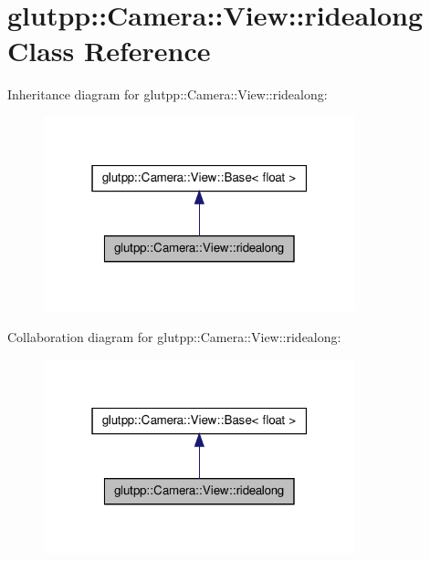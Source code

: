 \hypertarget{classglutpp_1_1Camera_1_1View_1_1ridealong}{\section{glutpp\-:\-:\-Camera\-:\-:\-View\-:\-:ridealong \-Class \-Reference}
\label{classglutpp_1_1Camera_1_1View_1_1ridealong}
}


\-Inheritance diagram for glutpp\-:\-:\-Camera\-:\-:\-View\-:\-:ridealong\-:
\nopagebreak
\begin{figure}[H]
\begin{center}
\leavevmode
\includegraphics[width=256pt]{classglutpp_1_1Camera_1_1View_1_1ridealong__inherit__graph}
\end{center}
\end{figure}


\-Collaboration diagram for glutpp\-:\-:\-Camera\-:\-:\-View\-:\-:ridealong\-:
\nopagebreak
\begin{figure}[H]
\begin{center}
\leavevmode
\includegraphics[width=256pt]{classglutpp_1_1Camera_1_1View_1_1ridealong__coll__graph}
\end{center}
\end{figure}
